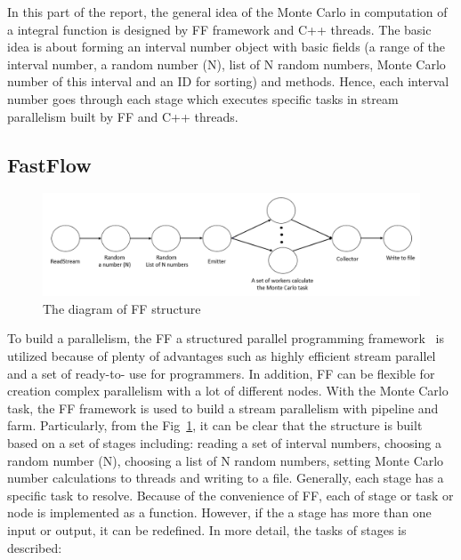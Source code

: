 \documentclass[runningheads,a4paper]{llncs}
\begin{document}
In this part of the report, the general idea of the Monte Carlo in computation of a integral
function is designed by FF framework and C++ threads. The basic idea is about forming an
interval number object with basic fields (a range of the interval number, a random number
(N), list of N random numbers, Monte Carlo number of this interval and an ID for sorting)
and methods. Hence, each interval number goes through each stage which executes specific
tasks in stream parallelism built by FF and C++ threads.


\subsection{FastFlow}
\label{subsec:ff}

\begin{figure}[h!]
	\centering
	\includegraphics[scale = 0.4]{image/ffStructure}	
	\caption{The diagram of FF structure}
	\label{Fig:ffStructure}
\end{figure}

To build a parallelism, the FF a structured parallel programming framework~\cite{fastflow} is utilized
because of plenty of advantages such as highly efficient stream parallel and a set of ready-to-
use for programmers. In addition, FF can be flexible for creation complex parallelism with a
lot of different nodes.
With the Monte Carlo task, the FF framework is used to build a stream parallelism with
pipeline and farm. Particularly, from the Fig~\ref{Fig:ffStructure}, it can be clear that the structure is built based
on a set of stages including: reading a set of interval numbers, choosing a random number (N),
choosing a list of N random numbers, setting Monte Carlo number calculations to threads and
writing to a file.
Generally, each stage has a specific task to resolve. Because of the convenience of FF, each of
stage or task or node is implemented as a function. However, if the a stage has more than one
input or output, it can be redefined. In more detail, the tasks of stages is described:
\end{document}
